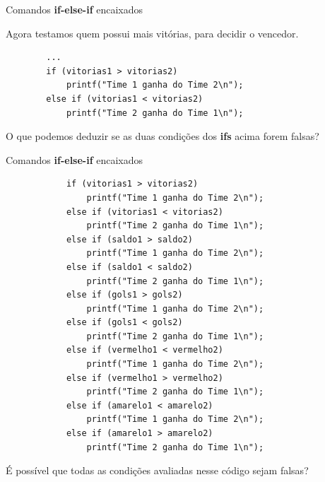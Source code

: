 \documentclass[handout]{beamer}
\begin{document}
\begin{frame}[fragile]{Comandos {\bf if-else-if} encaixados}

    Agora testamos quem possui mais vitórias, para decidir o vencedor.

    \begin{verbatim}
        ...
        if (vitorias1 > vitorias2)
            printf("Time 1 ganha do Time 2\n");
        else if (vitorias1 < vitorias2)
            printf("Time 2 ganha do Time 1\n");
    \end{verbatim}

    O que podemos deduzir se as duas condições dos {\bf ifs} acima forem falsas?
\end{frame}

\begin{frame}[fragile]{Comandos {\bf if-else-if} encaixados}

    \begin{minipage}{0.6\textwidth}
        \begin{verbatim}
            if (vitorias1 > vitorias2)
                printf("Time 1 ganha do Time 2\n");
            else if (vitorias1 < vitorias2)
                printf("Time 2 ganha do Time 1\n");
            else if (saldo1 > saldo2)
                printf("Time 1 ganha do Time 2\n");
            else if (saldo1 < saldo2)
                printf("Time 2 ganha do Time 1\n");
            else if (gols1 > gols2)
                printf("Time 1 ganha do Time 2\n");
            else if (gols1 < gols2)
                printf("Time 2 ganha do Time 1\n");
            else if (vermelho1 < vermelho2)
                printf("Time 1 ganha do Time 2\n");
            else if (vermelho1 > vermelho2)
                printf("Time 2 ganha do Time 1\n");
            else if (amarelo1 < amarelo2)
                printf("Time 1 ganha do Time 2\n");
            else if (amarelo1 > amarelo2)
                printf("Time 2 ganha do Time 1\n");
        \end{verbatim}
    \end{minipage}
    \pause
    \begin{minipage}{0.3\textwidth}
        É possível que todas as condições avaliadas nesse código sejam falsas?
    \end{minipage}
\end{frame}
\end{document}
